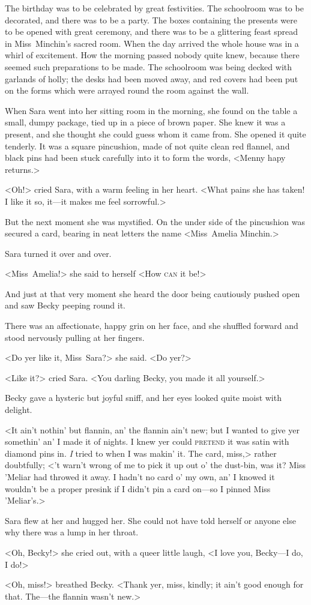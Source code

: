 The birthday was to be celebrated by great festivities. The schoolroom was to be decorated, and there was to be a party. The boxes containing the presents were to be opened with great ceremony, and there was to be a glittering feast spread in Miss~Minchin's sacred room. When the day arrived the whole house was in a whirl of excitement. How the morning passed nobody quite knew, because there seemed such preparations to be made. The schoolroom was being decked with garlands of holly; the desks had been moved away, and red covers had been put on the forms which were arrayed round the room against the wall.

When Sara went into her sitting room in the morning, she found on the table a small, dumpy package, tied up in a piece of brown paper. She knew it was a present, and she thought she could guess whom it came from. She opened it quite tenderly. It was a square pincushion, made of not quite clean red flannel, and black pins had been stuck carefully into it to form the words, <Menny hapy returns.>

<Oh!> cried Sara, with a warm feeling in her heart. <What pains she has taken! I like it so, it—it makes me feel sorrowful.>

But the next moment she was mystified. On the under side of the pincushion was secured a card, bearing in neat letters the name <Miss~Amelia Minchin.>

Sara turned it over and over.

<Miss~Amelia!> she said to herself <How \textsc{can} it be!>

And just at that very moment she heard the door being cautiously pushed open and saw Becky peeping round it.

There was an affectionate, happy grin on her face, and she shuffled forward and stood nervously pulling at her fingers.

<Do yer like it, Miss~Sara?> she said. <Do yer?>

<Like it?> cried Sara. <You darling Becky, you made it all yourself.>

Becky gave a hysteric but joyful sniff, and her eyes looked quite moist with delight.

<It ain't nothin' but flannin, an' the flannin ain't new; but I wanted to give yer somethin' an' I made it of nights. I knew yer could \textsc{pretend} it was satin with diamond pins in. \textit{I} tried to when I was makin' it. The card, miss,> rather doubtfully; <'t warn't wrong of me to pick it up out o' the dust-bin, was it? Miss 'Meliar had throwed it away. I hadn't no card o' my own, an' I knowed it wouldn't be a proper presink if I didn't pin a card on—so I pinned Miss 'Meliar's.>

Sara flew at her and hugged her. She could not have told herself or anyone else why there was a lump in her throat.

<Oh, Becky!> she cried out, with a queer little laugh, <I love you, Becky—I do, I do!>

<Oh, miss!> breathed Becky. <Thank yer, miss, kindly; it ain't good enough for that. The—the flannin wasn't new.>
